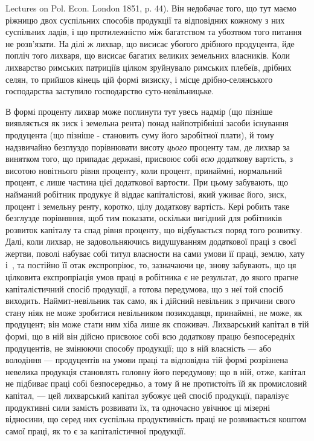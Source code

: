 \parcont{}  %
Lectures on Pol. Econ. London 1851, p. 44). Він недобачає того, що тут маємо
ріжницю двох суспільних способів продукції та відповідних кожному з них
суспільних ладів, і що протилежністю між багатством та убозтвом того питання
не розв’язати. На ділі ж лихвар, що висисає убогого дрібного продуцента, йде
попліч того лихваря, що висисає багатих великих земельних власників. Коли
лихварство римських патриціїв цілком зруйнувало римських плебеїв, дрібних
селян, то прийшов кінець цій формі визиску, і місце дрібно-селянського господарства
заступило господарство суто-невільницьке.

В формі проценту лихвар може поглинути тут увесь надмір (що пізніше
виявляється як зиск і земельна рента) понад найпотрібніші засоби існування
продуцента (що пізніше - становить суму його заробітної плати), й тому надзвичайно
безглуздо порівнювати висоту \emph{цього} проценту там, де лихвар за винятком
того, що припадає державі, присвоює собі \emph{всю} додаткову вартість, з висотою
новітнього рівня проценту, коли процент, принаймні, нормальний процент, є лише
частина цієї додаткової вартости. При цьому забувають, що найманий робітник
продукує й віддає капіталістові, який уживає його, зиск, процент і земельну
ренту, коротко, цілу додаткову вартість. Кері робить таке безглузде порівняння,
щоб тим показати, оскільки вигідний для робітників розвиток капіталу та спад
рівня проценту, що відбувається поряд того розвитку. Далі, коли лихвар, не
задовольняючись видушуванням додаткової праці з своєї жертви, поволі набуває
собі титул власности на сами умови її праці, землю, хату і~, та постійно
її отак експропріює, то, зазначаючи це, знову забувають, що ця цілковита експропріація
умов праці в робітника є не результат, до якого прагне капіталістичний
спосіб продукції, а готова передумова, що з неї той спосіб виходить. Наймит-невільник
так само, як і дійсний невільник з причини свого стану ніяк не може
зробитися невільником позикодавця, принаймні, не може, як продуцент; він може
стати ним хіба лише як споживач. Лихварський капітал в тій формі, що в ній
він дійсно присвоює собі всю додаткову працю безпосередніх продуцентів, не
змінюючи способу продукції; що в ній власність — або володіння — продуцентів
на умови праці та відповідна тій формі розрізнена невелика продукція становлять
головну його передумову; що в ній, отже, капітал не підбиває праці собі безпосередньо,
а тому й не протистоїть їй як промисловий капітал, — цей лихварський
капітал зубожує цей спосіб продукції, паралізує продуктивні сили
замість розвивати їх, та одночасно увічнює ці мізерні відносини, що серед них
суспільна продуктивність праці не розвивається коштом самої праці, як то є за
капіталістичної продукції.

